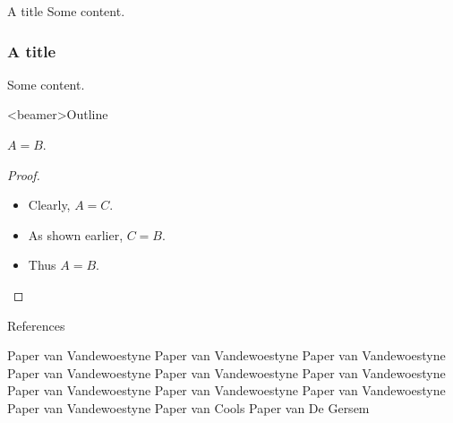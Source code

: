 \documentclass{beamer}
\begin{document}
\begin{frame}{A title}
  Some content.
\end{frame}

\begin{frame}
  \frametitle{A title}
  Some content.
\end{frame}

\begin{frame}<beamer>{Outline}  %
  \tableofcontents[current]
\end{frame}

\begin{frame}[<+->]
  \begin{theorem}
    $A = B$.
  \end{theorem}
  \begin{proof}
    \begin{itemize}
    \item Clearly, $A = C$.
    \item As shown earlier, $C = B$.
    \item<3-> Thus $A = B$.
    \end{itemize}
  \end{proof}
\end{frame}



\begin{frame}[allowframebreaks]{References}
  \begin{thebibliography}{XX}
   Paper van Vandewoestyne
   Paper van Vandewoestyne
   Paper van Vandewoestyne
   Paper van Vandewoestyne
   Paper van Vandewoestyne
   Paper van Vandewoestyne
   Paper van Vandewoestyne
   Paper van Vandewoestyne
   Paper van Vandewoestyne
   Paper van Vandewoestyne
   Paper van Cools
   Paper van De Gersem
  \end{thebibliography}
\end{frame}
\end{document}
